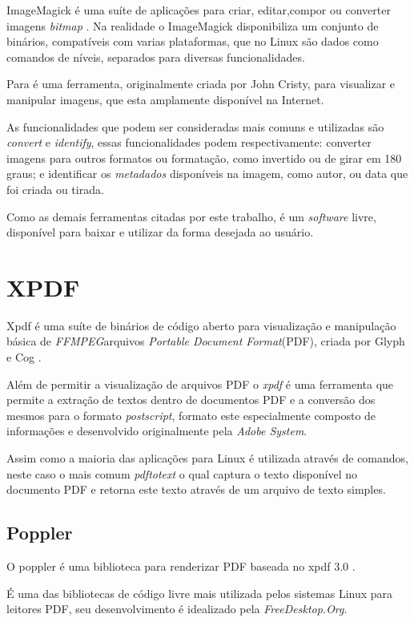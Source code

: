 ImageMagick é uma suíte de aplicações para criar, editar,compor ou converter imagens \textit{bitmap} \cite{IMAGEMAGICK-STUDIO}.
Na realidade o ImageMagick disponibiliza um conjunto de binários, compatíveis com varias plataformas, que no Linux são dados como comandos de níveis, separados para diversas funcionalidades.

Para \cite{TESLA} é uma ferramenta, originalmente criada por John Cristy, para visualizar e manipular imagens, que esta amplamente disponível na Internet.

As funcionalidades que podem ser consideradas mais comuns e utilizadas são \textit{convert} e \textit{identify}, essas funcionalidades podem respectivamente: converter imagens para outros formatos ou formatação, como invertido ou de girar em 180 graus; e identificar os \textit{metadados} disponíveis na imagem, como autor, ou data que foi criada ou tirada.

Como as demais ferramentas citadas por este trabalho, é um \textit{software} livre, disponível para baixar e utilizar da forma desejada ao usuário.


\section{XPDF}

Xpdf é uma suíte de binários de código aberto para visualização e manipulação básica de \textit{FFMPEG}arquivos \textit{Portable Document Format}(PDF), criada por Glyph e Cog \cite{GLYPH-COG}.

Além de permitir a visualização de arquivos PDF o \textit{xpdf} é uma ferramenta que permite a extração de textos dentro de documentos PDF e a conversão dos mesmos para o formato \textit{postscript}, formato este especialmente composto de informações e desenvolvido originalmente pela \textit{Adobe System}.

Assim como a maioria das aplicações para Linux é utilizada através de comandos, neste caso o mais comum \textit{pdftotext} o qual captura o texto disponível no documento PDF e retorna este texto através de um arquivo de texto simples.


\subsection{Poppler}

O poppler é uma biblioteca para renderizar PDF baseada no xpdf 3.0 \cite{JOHNSON}.

É uma das bibliotecas de código livre mais utilizada pelos sistemas Linux para leitores PDF, seu desenvolvimento é idealizado pela \textit{FreeDesktop.Org}.


